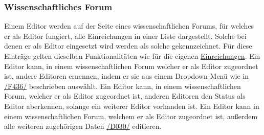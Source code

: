 \subsubsection{Wissenschaftliches Forum} \label{ed:wissFor}
\begin{description}
     Einem Editor werden auf der Seite eines wissenschaftlichen Forums, für
    welches er als Editor fungiert, alle Einreichungen in einer Liste dargestellt.
    Solche bei denen er als Editor eingesetzt wird werden als solche gekennzeichnet.
    Für diese Einträge gelten dieselben Funktionalitäten wie für die
    eigenen \hyperref[nut:ein]{Einreichungen}.
     Ein Editor kann, in einem wissenschaftlichen Forum welcher er als Editor zugeordnet ist,
    andere Editoren ernennen, indem er sie aus einem Dropdown-Menü
    wie in \hyperref[funkt:436]{/F436/} beschrieben auswählt.
     Ein Editor kann, in einem wissenschaftlichen Forum, welcher er als Editor zugeordnet ist,
    anderen Editoren den Status als Editor aberkennen,
    solange ein weiterer Editor vorhanden ist.
     Ein Editor kann in einem wissenschaftlichen Forum, welchem er als Editor zugeordnet ist,
    außerdem alle weiteren zugehörigen Daten \hyperref[d030]{/D030/} editieren.
\end{description}

